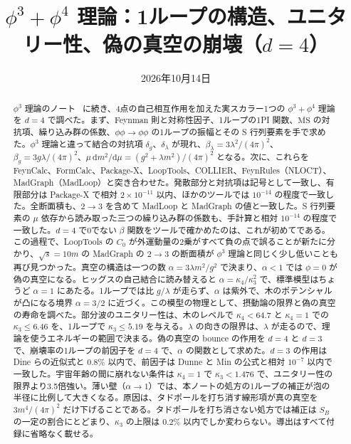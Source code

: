 \documentclass[a4paper,10pt]{ltjsarticle}
\title{$\phi^3+\phi^4$ 理論：1ループの構造、ユニタリー性、偽の真空の崩壊（$d=4$）}
\author{}
\date{2026年10月14日}
\newcommand{\dd}{\mathrm{d}}
\begin{document}
\maketitle

\begin{abstract}
$\phi^3$ 理論のノート~\cite{phi3note} に続き、4点の自己相互作用を加えた実スカラー1つの $\phi^3+\phi^4$ 理論を $d=4$ で調べた。まず、Feynman 則と対称性因子、1ループの1PI 関数、$\overline{\mathrm{MS}}$ の対抗項、繰り込み群の係数、$\phi\phi\to\phi\phi$ の1ループの振幅とその S 行列要素を手で求めた。$\phi^3$ 理論と違って結合の対抗項 $\delta_g$、$\delta_\lambda$ が現れ、$\beta_\lambda=3\lambda^2/(4\pi)^2$、$\beta_g=3g\lambda/(4\pi)^2$、$\mu\,\dd m^2/\dd\mu=(g^2+\lambda m^2)/(4\pi)^2$ となる。次に、これらを FeynCalc、FormCalc、Package-X、LoopTools、COLLIER、FeynRules（NLOCT）、MadGraph（MadLoop）と突き合わせた。発散部分と対抗項は記号として一致し、有限部分は Package-X で相対 $2\times10^{-11}$ 以内、ほかのツールでは $10^{-14}$ の程度で一致した。全断面積も、$2\to3$ を含めて MadLoop と MadGraph の値と一致した。S 行列要素の $\mu$ 依存から読み取った三つの繰り込み群の係数も、手計算と相対 $10^{-14}$ の程度で一致した。$d=4$ で0でない $\beta$ 関数をツールで確かめたのは、これが初めてである。この過程で、LoopTools の $C_0$ が外運動量の2乗がすべて負の点で誤ることが新たに分かり、$\sqrt s=10m$ の MadGraph の $2\to3$ の断面積が $\phi^3$ 理論と同じく少し低いことも再び見つかった。真空の構造は一つの数 $\alpha=3\lambda m^2/g^2$ で決まり、$\alpha<1$ では $\phi=0$ が偽の真空になる。ヒッグスの自己結合に読み替えると $\alpha=\kappa_4/\kappa_3^2$ で、標準模型はちょうど $\alpha=1$ にあたる。1ループでは比 $g/\lambda$ が走らず、$\alpha$ は紫外で、木のポテンシャルが凸になる境界 $\alpha=3/2$ に近づく。この模型の物理として、摂動論の限界と偽の真空の寿命を調べた。部分波のユニタリー性は、木のレベルで $\kappa_4<64.7$ と $\kappa_4=1$ での $\kappa_3\le6.46$ を、1ループで $\kappa_3\le5.19$ を与える。$\lambda$ の向きの限界は、$\lambda$ が走るので、理論を使うエネルギーの範囲で決まる。偽の真空の bounce の作用を $d=4$ と $d=3$ で、崩壊率の1ループの前因子を $d=4$ で、$\alpha$ の関数として求めた。$d=3$ の作用は Dine らの近似式と $0.8\%$ 以内で、前因子は Dunne と Min の公式と相対 $10^{-7}$ 以内で一致した。宇宙年齢の間に崩れない条件は $\kappa_4=1$ で $\kappa_3<1.476$ で、ユニタリー性の限界より3.5倍強い。薄い壁（$\alpha\to1$）では、本ノートの処方の1ループの補正が泡の半径に比例して大きくなる。原因は、タドポールを打ち消す線形項が真の真空を $3m^4/(4\pi)^2$ だけ下げることである。タドポールを打ち消さない処方では補正は $S_B$ の一定の割合にとどまり、$\kappa_3$ の上限は $0.2\%$ 以内でしか変わらない。導出はすべて付録に省略なく載せる。
\end{abstract}
\end{document}
